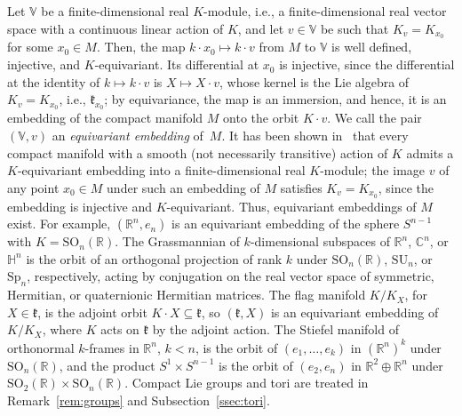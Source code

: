 \documentclass{article}
\newcommand{\R}{\mathbb{R}}
\newcommand{\C}{\mathbb{C}}
\newcommand{\frakk}{\mathfrak{k}}
\newcommand{\xc}[1]{\vspace{.1cm}
\noindent {\em #1} }
\theoremstyle{definition}
\theoremstyle{plain}
\begin{document}
\xc{Equivariant embeddings:}
 Let $\mathbb V$ be a finite-dimensional real $K$-module, i.e., a finite-dimensional real vector space with a continuous linear action of $K$, and let $v\in \mathbb V$ be such that $K_v=K_{x_0}$ for some $x_0\in M$.
Then, the map $k\cdot x_0\mapsto k\cdot v$ from $M$ to $\mathbb V$ is well defined, injective, and $K$-equivariant.
Its differential at $x_0$ is injective, since the differential at the identity of $k\mapsto k\cdot v$ is $X\mapsto X\cdot v$, whose kernel is the Lie algebra of $K_v =K_{x_0}$, i.e., $\frakk_{x_0}$; by equivariance, the map is an immersion, and hence, it is an embedding of the compact manifold $M$ onto the orbit $K\cdot v$.
We call the pair $(\mathbb V,v)$ an {\it equivariant embedding} of~$M$.
 It has been shown in~\cite{Mostow57,Palais57} that every compact manifold with a smooth (not necessarily transitive) action of $K$ admits a $K$-equivariant embedding into a finite-dimensional real $K$-module; the image $v$ of any point $x_0\in M$ under such an embedding of $M$ satisfies $K_v=K_{x_0}$, since the embedding is injective and $K$-equivariant.
Thus, equivariant embeddings of $M$ exist.
For example, $(\R^n,e_n)$ is an equivariant embedding of the sphere $S^{n-1}$ with $K=\mathrm{SO}_n(\R)$.
The Grassmannian of $k$-dimensional subspaces of $\R^n$, $\C^n$, or $\mathbb H^n$ is the orbit of an orthogonal projection of rank $k$ under $\mathrm{SO}_n(\R)$, $\mathrm{SU}_n$, or $\mathrm{Sp}_n$, respectively, acting by conjugation on the real vector space of symmetric, Hermitian, or quaternionic Hermitian matrices.
The flag manifold $K/K_X$, for $X\in\frakk$, is the adjoint orbit $K\cdot X\subseteq\frakk$, so $(\frakk,X)$ is an equivariant embedding of $K/K_X$, where $K$ acts on $\frakk$ by the adjoint action.
The Stiefel manifold of orthonormal $k$-frames in $\R^n$, $k<n$, is the orbit of $(e_1,\ldots,e_k)$ in $(\R^n)^k$ under $\mathrm{SO}_n(\R)$, and the product $S^1\times S^{n-1}$ is the orbit of $(e_2,e_n)$ in $\R^2\oplus\R^n$ under $\mathrm{SO}_2(\R)\times\mathrm{SO}_n(\R)$.
Compact Lie groups and tori are treated in Remark~\ref{rem:groups} and Subsection~\ref{ssec:tori}.
\end{document}
